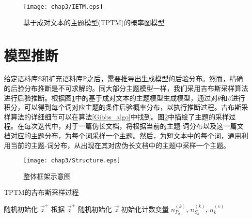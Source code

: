 \begin{figure}[ht]
    \centering
    \texttt{[image: chap3/IETM.eps]}
    \caption{基于成对文本的主题模型(TPTM)的概率图模型} 
    \label{TPTM_graph}
\end{figure}

\section{模型推断}
给定语料库$\mathbb{S}$和扩充语料库$\mathbb{P}$之后，需要推导出生成模型的后验分布。然而，精确的后验分布推断是不可求解的。同大部分主题模型一样，我们采用吉布斯采样算法进行后验推断。根据图\ref{TPTM_graph}中的基于成对文本的主题模型生成模型，通过对$\theta$和$\beta$进行积分，可以得到每个词对应主题的条件后验概率分布，以执行推断过程。吉布斯采样算法的详细细节可以在算法\ref{Gibbs_algo}中找到。图\ref{OverallFramework}中描绘了主题的采样过程。在每次迭代中，对于一篇伪长文档，将根据当前的主题-词分布以及这一篇文档对应的主题分布，为每个词采样一个主题。然后，为短文本中的每个词，通用利用当前的主题-词分布，从出现在其对应伪长文档中的主题中采样一个主题。

\begin{figure}[ht]
    \centering
    \texttt{[image: chap3/Structure.eps]}
    \caption{整体框架示意图} 
    \label{OverallFramework}
\end{figure}

\begin{algorithm}[tb]
    \caption{TPTM的吉布斯采样过程}
    \label{Gibbs_algo}
    \LinesNumbered
    随机初始化 $\vec{z}^+$\;
    根据 $\vec{z}^+$ 随机初始化 $\vec{z}$ \;
    初始化计数变量 $n_{P_d}^{(k)}$, $n_{S_d}^{(k)}$, $n_k^{(v)}$\;
\end{algorithm}

